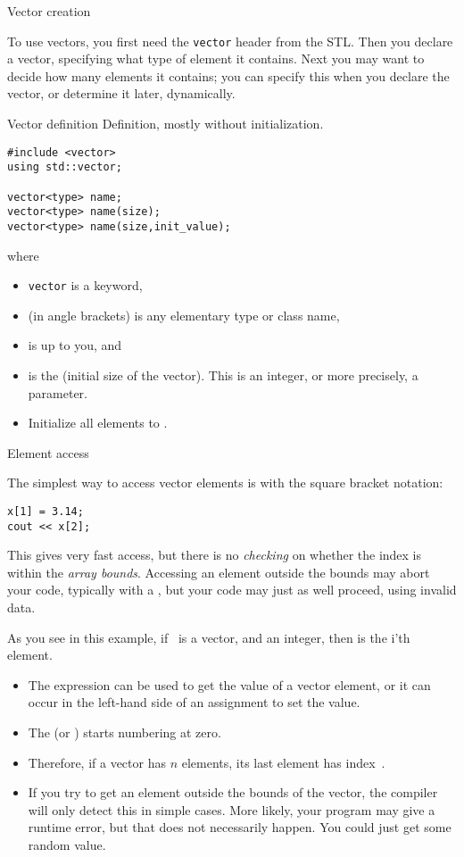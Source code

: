  {Vector creation}

To use vectors, you first need the \lstinline{vector} header from the
\ac{STL}. Then you declare a vector, specifying what type of element
it contains. Next you may want to decide how many elements it
contains; you can specify this when you declare the vector, or
determine it later, dynamically.

\begin{block}{Vector definition}
  \label{sl:vector-def}
  Definition, mostly without initialization.
\begin{lstlisting}
#include <vector>
using std::vector;

vector<type> name;
vector<type> name(size);
vector<type> name(size,init_value);
\end{lstlisting}
where
\begin{itemize}
\item \lstinline{vector} is a keyword,
\item {} (in angle brackets) is any elementary type or class
  name,
\item {} is up to you, and
\item {} is the (initial size of the vector). This is an integer,
  or more precisely, a  parameter.
\item Initialize all elements to .
\end{itemize}
\end{block}

 {Element access}

The simplest way to access vector elements is with the square bracket notation:
\begin{lstlisting}
x[1] = 3.14;
cout << x[2];
\end{lstlisting}
This gives very fast access, but there is no \emph{checking} on whether the
index is within the \emph{array
  bounds}. Accessing an element outside
the bounds may abort your code, typically with a
, but your code may just as well
proceed, using invalid data.

As you see in this example, if ~is a vector, and  an
integer, then  is the i'th element.
\begin{itemize}
\item The expression  can be used to get the value of a
  vector element, or it can occur in the left-hand side of an
  assignment to set the value.
\item The  (or
  )  starts numbering at zero.
\item Therefore, if a vector has $n$ elements, its last element has
  index~.
\item If you try to get an element outside the bounds of the vector,
  the compiler will only detect this in simple cases. More likely,
  your program may give a runtime error, but that does not necessarily
  happen. You could just get some random value.
\end{itemize}

